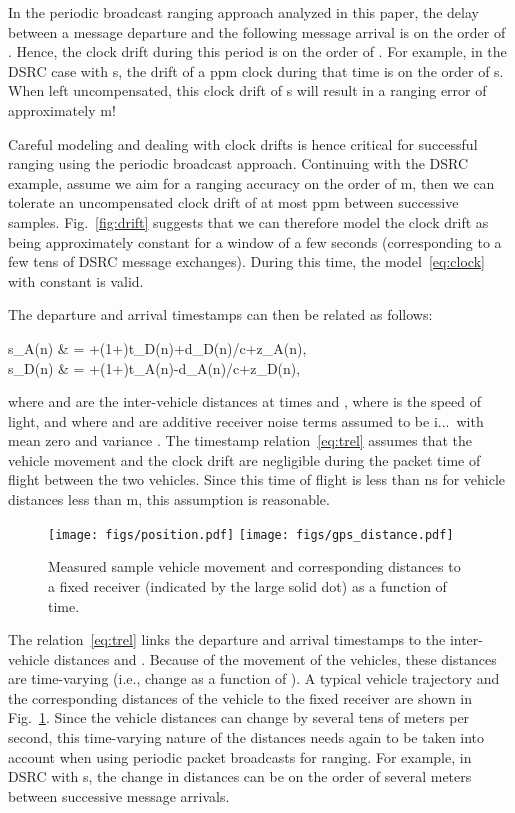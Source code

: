 \documentclass[12pt,journal,final,onecolumn]{IEEEtran}
\makeatletter
\newcommand{\iid}{i.\@i.\@d.\ }
\theoremstyle{definition}
\theoremstyle{myremark}
\makeatother
\begin{document}
In the periodic broadcast ranging approach analyzed in this paper, the delay
between a message departure and the following message arrival is on the order of
. Hence, the clock drift during this period is on the order of .  For example, in the DSRC case with  s, the drift of a  ppm
clock during that time is on the order of  s. When left uncompensated,
this clock drift of  s will result in a ranging error of approximately
 m! 

Careful modeling and dealing with clock drifts is hence critical for successful
ranging using the periodic broadcast approach. Continuing with the DSRC example,
assume we aim for a ranging accuracy on the order of  m, then we can
tolerate an uncompensated clock drift of at most  ppm between successive
samples.  Fig.~\ref{fig:drift} suggests that we can therefore model the clock
drift as being approximately constant for a window of a few seconds
(corresponding to a few tens of DSRC message exchanges). During this time, the
model~\eqref{eq:clock} with constant  is valid. 

The departure and arrival timestamps can then be related as follows:

        s_A(n) & = \theta+(1+\delta)t_D(n)+d_D(n)/c+z_A(n), \\
        s_D(n) & = \theta+(1+\delta)t_A(n)-d_A(n)/c+z_D(n), 
    
where  and  are the inter-vehicle distances at times  and
, where  is the speed of light, and where  and  are
additive receiver noise terms assumed to be \iid with mean zero and variance
. The timestamp relation~\eqref{eq:trel} assumes
that the vehicle movement and the clock drift are negligible during the packet time of
flight between the two vehicles. Since this time of flight is less than  ns
for vehicle distances less than  m, this assumption is reasonable.

\begin{figure}[htbp]
    \centering 
    \texttt{[image: figs/position.pdf]} 
    \texttt{[image: figs/gps\_distance.pdf]} 

    \caption{Measured sample vehicle movement and corresponding distances to a
        fixed receiver (indicated by the large solid dot) as a function of time.}
    \label{fig:movement}
\end{figure}

The relation~\eqref{eq:trel} links the departure and arrival timestamps to the
inter-vehicle distances  and . Because of the movement of the
vehicles, these distances are time-varying (i.e., change as a function of ).
A typical vehicle trajectory and the corresponding distances of the vehicle to the fixed receiver are shown in
Fig.~\ref{fig:movement}. Since the vehicle distances can change by several tens
of meters per second, this time-varying nature of the distances needs again to
be taken into account when using periodic packet broadcasts for ranging. For example, in DSRC
with  s, the change in distances can be on the order of several meters
between successive message arrivals.
\end{document}
